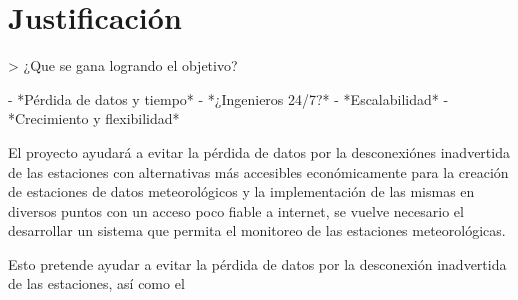 \section{Justificación}

> ¿Que se gana logrando el objetivo?

- *Pérdida de datos y tiempo*
- *¿Ingenieros 24/7?*
- *Escalabilidad*
- *Crecimiento y flexibilidad*

El proyecto ayudará a evitar la pérdida de datos por la desconexiónes inadvertida de las estaciones con alternativas más accesibles económicamente para la creación de estaciones de datos meteorológicos \cite{hernandezimplementacion} y la implementación de las mismas en diversos puntos con un acceso poco fiable a internet, se vuelve necesario el desarrollar un sistema que permita el monitoreo de las estaciones meteorológicas.

Esto pretende ayudar a evitar la pérdida de datos por la desconexión inadvertida de las estaciones, así como el

